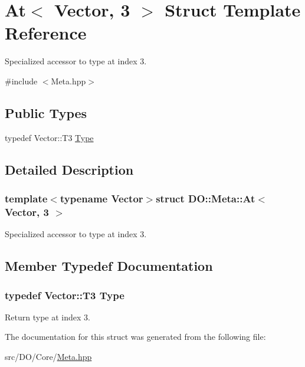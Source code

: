 \hypertarget{struct_d_o_1_1_meta_1_1_at_3_01_vector_00_013_01_4}{\section{At$<$ Vector, 3 $>$ Struct Template Reference}
\label{struct_d_o_1_1_meta_1_1_at_3_01_vector_00_013_01_4}
}


Specialized accessor to type at index 3.  




{\ttfamily \#include $<$Meta.\-hpp$>$}

\subsection*{Public Types}
\begin{DoxyCompactItemize}
\item 
typedef Vector\-::\-T3 \hyperlink{struct_d_o_1_1_meta_1_1_at_3_01_vector_00_013_01_4_a5839979308a51f444810a073ebee999d}{Type}
\end{DoxyCompactItemize}


\subsection{Detailed Description}
\subsubsection*{template$<$typename Vector$>$struct D\-O\-::\-Meta\-::\-At$<$ Vector, 3 $>$}

Specialized accessor to type at index 3. 

\subsection{Member Typedef Documentation}
\hypertarget{struct_d_o_1_1_meta_1_1_at_3_01_vector_00_013_01_4_a5839979308a51f444810a073ebee999d}{
\subsubsection[{Type}]{\setlength{\rightskip}{0pt plus 5cm}typedef Vector\-::\-T3 {\bf Type}}}\label{struct_d_o_1_1_meta_1_1_at_3_01_vector_00_013_01_4_a5839979308a51f444810a073ebee999d}
Return type at index 3. 

The documentation for this struct was generated from the following file\-:\begin{DoxyCompactItemize}
\item 
src/\-D\-O/\-Core/\hyperlink{_meta_8hpp}{Meta.\-hpp}\end{DoxyCompactItemize}
